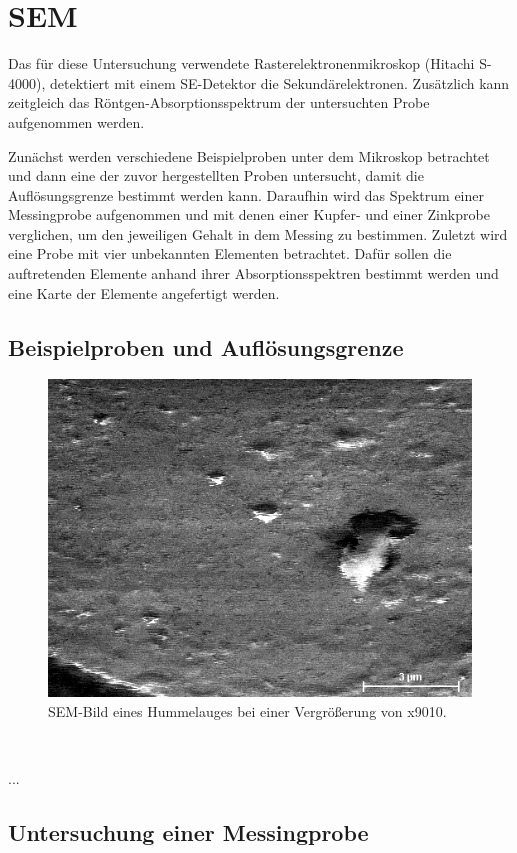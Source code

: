 \section{SEM}

	Das für diese Untersuchung verwendete Rasterelektronenmikroskop (Hitachi S-4000), detektiert mit einem SE-Detektor die Sekundärelektronen.
	Zusätzlich kann zeitgleich das Röntgen-Absorptionsspektrum der untersuchten Probe aufgenommen werden.

	Zunächst werden verschiedene Beispielproben unter dem Mikroskop betrachtet und dann eine der zuvor hergestellten Proben untersucht, damit die Auflösungsgrenze bestimmt werden kann.
	Daraufhin wird das Spektrum einer Messingprobe aufgenommen und mit denen einer Kupfer- und einer Zinkprobe verglichen, um den jeweiligen Gehalt in dem Messing zu bestimmen.
	Zuletzt wird eine Probe mit vier unbekannten Elementen betrachtet.
	Dafür sollen die auftretenden Elemente anhand ihrer Absorptionsspektren bestimmt werden und eine Karte der Elemente angefertigt werden.

\subsection{Beispielproben und Auflösungsgrenze} %

	\begin{figure}[ht]
		\centering
		\includegraphics[width=.35\textwidth]{raw/SEM/Hummelauge_M9010}
		\caption{SEM-Bild eines Hummelauges bei einer Vergrößerung von x9010.}
		\label{fig:Hummelaugex9010}
	\end{figure}

	\

	...

\subsection{Untersuchung einer Messingprobe}

